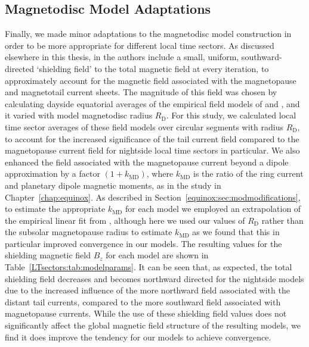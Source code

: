 \subsection{Magnetodisc Model Adaptations}\label{LTsectors:sec:adaptations}
Finally, we made minor adaptations to the magnetodisc model construction in order to be more appropriate for different local time sectors. As discussed elsewhere in this thesis, in \citet{achilleos2010a} the authors include a small, uniform, southward-directed `shielding field' to the total magnetic field at every iteration, to approximately account for the magnetic field associated with the magnetopause and magnetotail current sheets. The magnitude of this field was chosen by calculating dayside equatorial averages of the empirical field models of \citet{alexeev2005} and \citet{alexeev2006}, and it varied with model magnetodisc radius $R_\mathrm{D}$. For this study, we calculated local time sector averages of these field models over circular segments with radius $R_\mathrm{D}$, to account for the increased significance of the tail current field compared to the magnetopause current field for nightside local time sectors in particular. We also enhanced the field associated with the magnetopause current beyond a dipole approximation by a factor $(1+k_\mathrm{MD})$, where $k_\mathrm{MD}$ is the ratio of the ring current and planetary dipole magnetic moments, as in the study in Chapter~\ref{chap:equinox}. As described in Section~\ref{equinox:sec:modmodifications}, to estimate the appropriate $k_\mathrm{MD}$ for each model we employed an extrapolation of the empirical linear fit from \citet{bunce2007}, although here we used our values of $R_\mathrm{D}$ rather than the subsolar magnetopause radius to estimate $k_\mathrm{MD}$ as we found that this in particular improved convergence in our models. The resulting values for the shielding magnetic field $B_z$ for each model are shown in Table~\ref{LTsectors:tab:modelparams}. It can be seen that, as expected, the total shielding field decreases and becomes northward directed for the nightside models due to the increased influence of the more northward field associated with the distant tail currents, compared to the more southward field associated with magnetopause currents. While the use of these shielding field values does not significantly affect the global magnetic field structure of the resulting models, we find it does improve the tendency for our models to achieve convergence.


